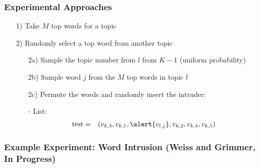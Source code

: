 \documentclass{beamer}
\numberwithin{equation}{section}
\begin{document}
\begin{frame}
\frametitle{Experimental Approaches}


\begin{itemize}
\item[1)] Take $M$ top words for a topic
\item[2)] Randomly select a top word from another topic
\begin{itemize}
\item[2a)] Sample the topic number from $l$ from $K-1$ (uniform probability)
\item[2b)] Sample word $j$ from the $M$ top words in topic $l$
\item[2c)] Permute the words and randomly insert the \alert{intruder}:
\item[-] List:
\begin{eqnarray}
\text{test} &  =  & (v_{k, 3}, v_{k, 1}, \alert{v_{l, j}}, v_{k, 2}, v_{k, 4}, v_{k,5}) \nonumber
\end{eqnarray}
\end{itemize}
\end{itemize}




\end{frame}

\begin{frame}
\frametitle{Example Experiment: Word Intrusion (Weiss and Grimmer, In Progress)}




  \\

\vspace{0.25in}


\pause \pause \pause \pause \pause


\end{frame}
\end{document}
